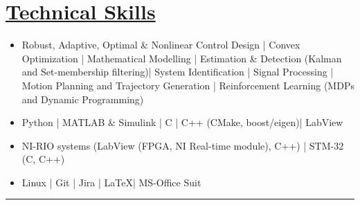 \section*{\underline{Technical Skills}}
\begin{itemize}
        \item[\itbf{Control and Estimation:}] Robust, Adaptive, Optimal \& Nonlinear Control Design |
        Convex Optimization | Mathematical Modelling |
        Estimation \& Detection (Kalman and Set-membership filtering)|
        System Identification | Signal Processing |
        Motion Planning and Trajectory Generation |
        Reinforcement Learning (MDPs and Dynamic Programming)
        \item[\itbf{Programming:}] Python | MATLAB \& Simulink | C | C++ (CMake, boost/eigen)| LabView
        \item[\itbf{Embedded Systems:}] NI-RIO systems (LabView (FPGA, NI Real-time module), C++) | STM-32 (C, C++)
        \item[\itbf{OS \& Tools:}] Linux | Git | Jira | \LaTeX | MS-Office Suit
\end{itemize}
\noindent\rule{\textwidth}{0.4pt}
